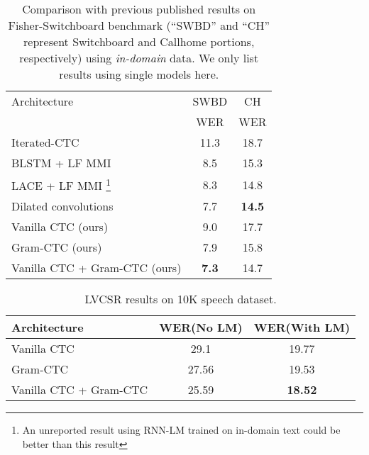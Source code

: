 \documentclass{article}
\begin{document}
\begin{table}[t]
\begin{center}
\small{
\begin{tabular}{l|c|c}
\toprule
Architecture &  SWBD & CH  \\
  & WER & WER  \\
\midrule
Iterated-CTC  \cite{geoffery2016ctc} & 11.3 & 18.7 \\ %
BLSTM + LF MMI  \cite{povey2016purely} & 8.5 & 15.3 \\ %
LACE + LF MMI \footnote{An unreported result using RNN-LM trained on in-domain text could be better than this result}
 \cite{xiong2016achieving} & 8.3 & 14.8 \\ %
Dilated convolutions  \cite{sercu2016dense} & 7.7 & \textbf{14.5} \\ %
\midrule
Vanilla CTC  (ours) & 9.0 & 17.7   \\ %
Gram-CTC  (ours) & 7.9 & 15.8  \\ %
Vanilla CTC + Gram-CTC  (ours) & \textbf{7.3} & 14.7  \\ %
\bottomrule
\end{tabular}
}
\end{center}
\vspace{-10pt}
\caption{Comparison with previous published results on Fisher-Switchboard benchmark (``SWBD'' and ``CH'' represent Switchboard and Callhome portions, respectively) using {\it in-domain} data. We only list results using single models here.}
\label{table:fisher}
\end{table}


\begin{table}[t]
\small{
\begin{tabular}{l|c|c}
\toprule
Architecture & WER(No LM) & WER(With LM) \\
\midrule
Vanilla CTC  & 29.1 & 19.77 \\ %
Gram-CTC & 27.56 & 19.53 \\ %
Vanilla CTC + Gram-CTC & 25.59 & \textbf{18.52} \\ %
\bottomrule
\end{tabular}
}
\vspace{-5pt}
\caption{LVCSR results on 10K speech dataset.}
\label{table:10k}
\end{table}
\end{document}
